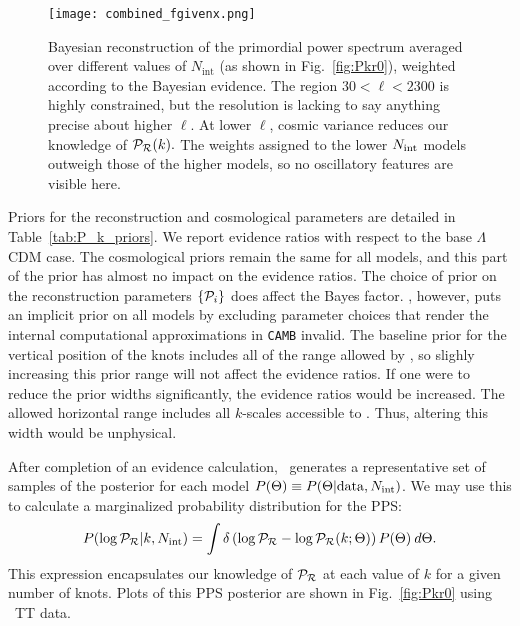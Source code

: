 \begin{figure}
\begin{center}
  \texttt{[image: combined\_fgivenx.png]}
\end{center}
\caption{
Bayesian reconstruction of the primordial power spectrum averaged over different values of $N_\mathrm{int}$
(as shown in Fig.~\protect\ref{fig:Pkr0}), weighted according to the Bayesian evidence.
The region ${30<\ell<2300}$ is highly constrained, but the resolution is lacking to say anything precise 
about higher $\ell$. At lower $\ell$, cosmic variance reduces our knowledge of $\mathcal{P}_\mathcal{R}(k).$
The weights assigned to the lower $N_\mathrm{int}$ models outweigh those of the higher models, so no oscillatory 
features are visible here.
\label{fig:full_bayes_knots}}
\end{figure}



Priors for the reconstruction and cosmological parameters are detailed in Table~\ref{tab:P_k_priors}.
We report evidence ratios with respect to the base $\Lambda$CDM case. The cosmological priors remain the
same for all models, and this part of the prior has almost no impact on the evidence ratios.
The choice of prior on the reconstruction parameters
$\{\mathcal{P}_{i}\}$ does affect the Bayes factor. \CosmoMC , however, puts an implicit prior on all models by excluding
parameter choices that render the internal computational approximations in {\tt CAMB} invalid.
The baseline prior for the vertical position of the knots includes all
of the range allowed by \CosmoMC, so slighly increasing this prior range will not affect the evidence ratios. If
one were to reduce the prior widths significantly, the evidence ratios would be increased.
The allowed horizontal range includes all $k$-scales accessible to \Planck. Thus, altering this
width would be unphysical.


After completion of an evidence calculation, \PolyChord\ generates a representative set of samples of the posterior for each model
$P(\Theta) \equiv P(\Theta|\mathrm{data},N_\mathrm{int})$. We may use this to calculate a marginalized probability distribution
for the PPS:
\begin{equation}
  P(\log\mathcal{P}_\mathcal{R}|k,N_\mathrm{int}) = \int \delta\left(\log\mathcal{P}_\mathcal{R} - \log\mathcal{P}_\mathcal{R}(k;\Theta)\right)P(\Theta)\:d\Theta.
  \label{eqn:margPR}
\end{equation}
This expression encapsulates our knowledge of $\mathcal{P}_\mathcal{R}$ at each value of $k$ for a given number of knots.
Plots of this PPS posterior are shown in Fig.~\ref{fig:Pkr0} using \Planck\ TT data.



